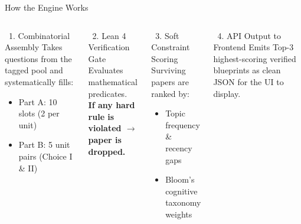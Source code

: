 \documentclass[aspectratio=169]{beamer}
\begin{document}
\begin{frame}{How the Engine Works}
  \begin{columns}[T]
    \begin{block}{\faThLarge\ 1. Combinatorial Assembly}
      Takes questions from the tagged pool and systematically fills:
      \begin{itemize}
        \item Part A: 10 slots (2 per unit)
        \item Part B: 5 unit pairs (Choice I \& II)
      \end{itemize}
    \end{block}
    \begin{block}{\faShieldAlt\ 2. Lean 4 Verification Gate}
      Evaluates mathematical predicates. \\
      \textbf{If any hard rule is violated $\to$ paper is dropped.}
    \end{block}

    \begin{block}{\faBalanceScale\ 3. Soft Constraint Scoring}
      Surviving papers are ranked by:
      \begin{itemize}
        \item Topic frequency \& recency gaps
        \item Bloom's cognitive taxonomy weights
      \end{itemize}
    \end{block}
    \begin{block}{\faDesktop\ 4. API Output to Frontend}
      Emits Top-3 highest-scoring verified blueprints as clean JSON for the UI to display.
    \end{block}
  \end{columns}
\end{frame}
\end{document}
